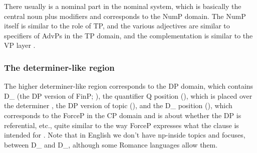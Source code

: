 \documentclass[UTF8, a4paper, oneside, scheme=plain, 12pt]{ctexbook}
\begin{document}
{There usually is a nominal part in the nominal system,
which is basically the central noun plus modifiers
and corresponds to the NumP domain.
The NumP itself is similar to the role of TP,
and the various adjectives are similar to specifiers of AdvPs in the TP domain,
and the complementation is similar to the VP layer
\citep{laenzlinger2017view}. 

\subsubsection{The determiner-like region}

The higher determiner-like region corresponds to the DP domain,
which contains D_{} (the DP version of FinP; ),
the quantifier Q position (),
which is placed over the determiner \citep{gianollo2021reference},
the DP version of topic (),
and the D_{} position (),
which corresponds to the ForceP in the CP domain
and is about whether the DP is referential, etc.,
quite similar to the way ForceP expresses what the clause is intended for
\citep{laenzlinger2005french}.
Note that in English we don't have \acs{np}-inside topics and focuses,
between D_{} and D_{},
although some Romance languages allow them.

}
\end{document}
